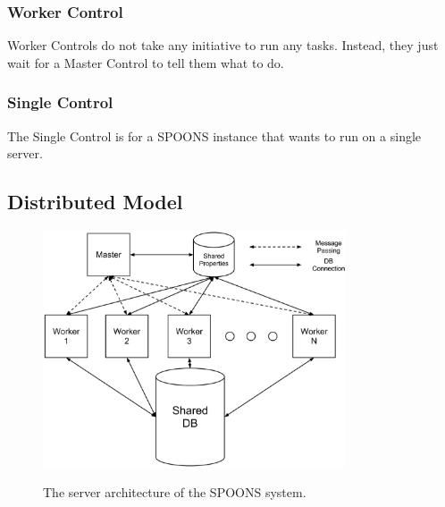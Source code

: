 \documentclass[12pt]{ucthesis}
\newcommand{\captionfonts}{\small\bf\ssp}
\begin{document}
\subsubsection{Worker Control}
\label{arch-worker-control}
Worker Controls do not take any initiative to run any tasks. Instead, they just wait for a Master Control to tell them what to do.

\subsubsection{Single Control}
\label{arch-single-control}
The Single Control is for a SPOONS instance that wants to run on a single server.

\subsection{Distributed Model}
\label{arch-dist}

\begin{figure}
   \begin{center}
      \includegraphics[width=0.8\textwidth]{images/SPOONS_Server_Architecture.eps}
      \captionfonts
      \caption[SPOONS Server Architecture]{The server architecture of the SPOONS system.}
      \label{fig:serverArch}
   \end{center}
\end{figure}
\end{document}

